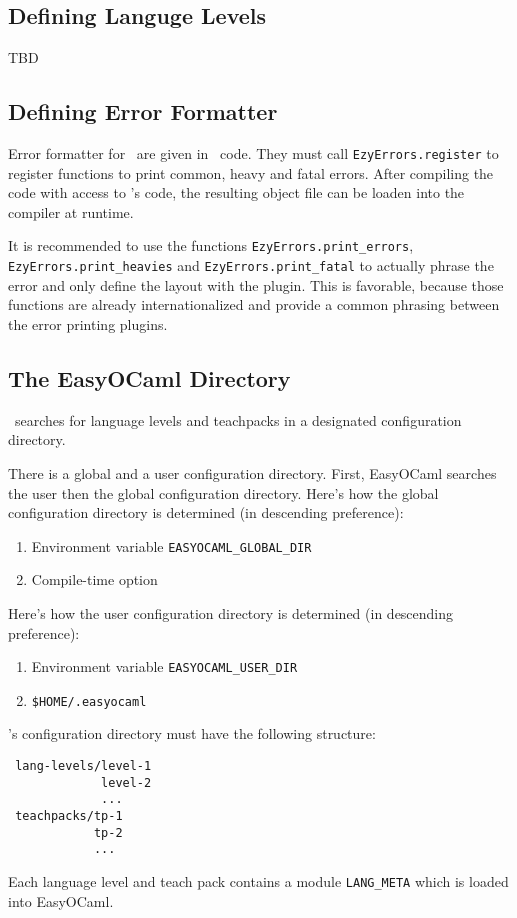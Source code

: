 \subsection{Defining Languge Levels}
TBD

\subsection{Defining Error Formatter}
\label{sec:errorfmt}

Error formatter for \easyocaml\ are given in \ocaml\ code. They must call
\texttt{EzyErrors.register} to register functions to print common, heavy and
fatal errors. After compiling the code with access to \easyocaml's code, the
resulting object file can be loaden into the compiler at runtime.

It is recommended to use the functions \texttt{EzyErrors.print\_errors},
\texttt{EzyErrors.print\_heavies} and \texttt{EzyErrors.print\_fatal} to
actually phrase the error and only define the layout with the plugin. This is
favorable, because those functions are already internationalized and provide a
common phrasing between the error printing plugins.

\subsection{The EasyOCaml Directory}
\label{sec:directory}

\easyocaml\ searches for language levels and teachpacks in a designated
configuration directory.

There is a global and a user configuration directory. First, EasyOCaml 
searches the user then the global configuration directory.  Here's how 
the global configuration directory is determined (in descending 
preference):

\begin{enumerate}
    \item Environment variable \texttt{EASYOCAML\_GLOBAL\_DIR}
    \item Compile-time option
\end{enumerate}

Here's how the user configuration directory is determined (in descending 
preference):

\begin{enumerate}
    \item Environment variable \texttt{EASYOCAML\_USER\_DIR}
    \item \texttt{\$HOME/.easyocaml}
\end{enumerate}

\easyocaml's configuration directory must have the following structure:

\begin{verbatim}
 lang-levels/level-1
             level-2
             ...
 teachpacks/tp-1
            tp-2
            ...
\end{verbatim}

Each language level and teach pack contains a module \texttt{LANG\_META} 
which is loaded into EasyOCaml.

